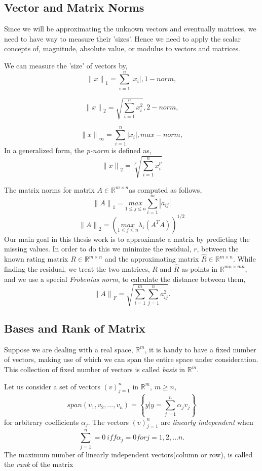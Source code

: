 \subsection{Vector and Matrix Norms}
Since we will be approximating the unknown vectors and eventually matrices, we
need to have way to measure their 'sizes'. Hence we need to apply the scalar
concepts of, magnitude, absolute value, or modulus to vectors and matrices.

We can measure the 'size' of vectors by,
\[
 {\|x\|}_1 = \sum_{i=1}^{n}|x_i|,		1-norm,
\]

\[
 {\|x\|}_2 = \sqrt{\sum_{i=1}^{n}x_i^2},		2-norm,
\]

\[
 {\|x\|}_\infty = \sum_{i=1}^{n}|x_i|,		max-norm,
\]
 In a generalized form, the \emph{p-norm} is defined as, 
 \[
 {\|x\|}_2 = \sqrt[p]{\sum_{i=1}^{n}x_i^p}
 \]

 The matrix norms for matrix $A\in\mathbb{R}^{m \times n}$as computed as
follows,
 \[
 {\|A\|}_1 = \underset{1\leq j\leq n}{max}{\sum_{i=1}^{m}|a_{ij}|}
 \]
 \[
 {\|A\|}_2 = (\underset{1\leq j\leq n}{max}{\lambda_i(A^TA)})^{1/2}
 \]
Our main goal in this thesis work is to approximate a matrix by predicting the
missing values. In order to do this we minimize the residual, $r$, between the
known rating matrix $R\in\mathbb{R}^{m \times n}$ and the approximating matrix
$\hat{R}\in\mathbb{R}^{m \times n}$. While finding the residual, we treat the
two matrices, $R$ and $\hat{R}$ as points in $\mathbb{R}^{mn \times mn}$, and we
use a special \emph{Frobenius norm}, to calculate the distance between them,
 \[
 {\|A\|}_F = \sqrt{\sum_{i=1}^{m}\sum_{j=1}^{n}a_{ij}^2}.
 \]
 
 \subsection{Bases and Rank of Matrix}
 Suppose we are dealing with a real space, $\mathbb{R}^m$, it is handy
to have a fixed number of vectors, making use of which we can span the entire
space under consideration. This collection of fixed number of vectors is called
\emph{basis} in $\mathbb{R}^m$. 

Let us consider a set of vectors $(v)_{j=1}^n$ in $\mathbb{R}^m$, $m\geq n$, 
\[
 span(v_1,v_2,...,v_n)=\left\{ y|y=\sum_{j=1}^{n}\alpha_{j}v_j \right\}
\]
for arbitrary coefficients $\alpha_j$. The vectors $(v)_{j=1}^n$ are
\emph{linearly independent} when
\[
 \sum_{j=1}^{n}=0 \ iff \alpha_j = 0 for j=1,2,...n.
\]
The maximum number of linearly independent vectors(column or row), is called the
\emph{rank} of the matrix \cite{eld-mm:07}

